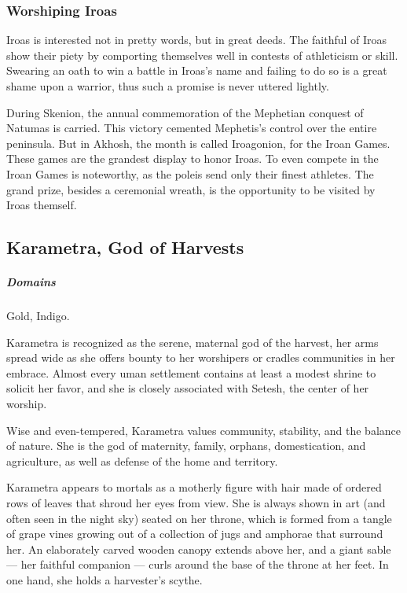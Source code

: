     \subsubsection{Worshiping Iroas}
        Iroas is interested not in pretty words, but in great deeds.
        The faithful of Iroas show their piety by comporting themselves well in contests of athleticism or skill.
        Swearing an oath to win a battle in Iroas's name and failing to do so is a great shame upon a warrior, thus such a promise is never uttered lightly.

        During Skenion, the annual commemoration of the Mephetian conquest of Natumas is carried.
        This victory cemented Mephetis's control over the entire peninsula.
        But in Akhosh, the month is called Iroagonion, for the Iroan Games.
        These games are the grandest display to honor Iroas.
        To even compete in the Iroan Games is noteworthy, as the poleis send only their finest athletes.
        The grand prize, besides a ceremonial wreath, is the opportunity to be visited by Iroas themself.
\subsection*{Karametra, God of Harvests} \label{ssec::karametra}
    \subparagraph{Domains} Gold, Indigo.

    Karametra is recognized as the serene, maternal god of the harvest, her arms spread wide as she offers bounty to her worshipers or cradles communities in her embrace.
    Almost every uman settlement contains at least a modest shrine to solicit her favor, and she is closely associated with Setesh, the center of her worship.

    Wise and even-tempered, Karametra values community, stability, and the balance of nature.
    She is the god of maternity, family, orphans, domestication, and agriculture, as well as defense of the home and territory.

    Karametra appears to mortals as a motherly figure with hair made of ordered rows of leaves that shroud her eyes from view.
    She is always shown in art (and often seen in the night sky) seated on her throne, which is formed from a tangle of grape vines growing out of a collection of jugs and amphorae that surround her.
    An elaborately carved wooden canopy extends above her, and a giant sable --- her faithful companion --- curls around the base of the throne at her feet.
    In one hand, she holds a harvester's scythe.

